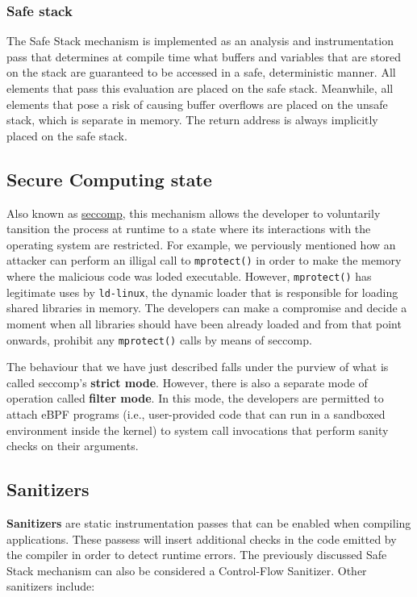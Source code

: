\subsubsection{Safe stack}

The Safe Stack \cite{kuznetzov2018code} mechanism is implemented as an analysis
and instrumentation pass that determines at compile time what buffers and
variables that are stored on the stack are guaranteed to be accessed in a safe,
deterministic manner. All elements that pass this evaluation are placed on the
safe stack. Meanwhile, all elements that pose a risk of causing buffer overflows
are placed on the unsafe stack, which is separate in memory. The return address
is always implicitly placed on the safe stack.

\subsection{Secure Computing state}

Also known as \href{https://www.man7.org/linux/man-pages/man2/seccomp.2.html}{seccomp},
this mechanism allows the developer to voluntarily tansition the process at
runtime to a state where its interactions with the operating system are
restricted. For example, we perviously mentioned how an attacker can perform
an illigal call to \texttt{mprotect()} in order to make the memory where the
malicious code was loded executable. However, \texttt{mprotect()} has legitimate
uses by \texttt{ld-linux}, the dynamic loader that is responsible for loading
shared libraries in memory. The developers can make a compromise and decide a
moment when all libraries should have been already loaded and from that point
onwards, prohibit any \texttt{mprotect()} calls by means of seccomp.

The behaviour that we have just described falls under the purview of what is
called seccomp's \textbf{strict mode}. However, there is also a separate mode
of operation called \textbf{filter mode}. In this mode, the developers are
permitted to attach eBPF programs (i.e., user-provided code that can run in a
sandboxed environment inside the kernel) to system call invocations that perform
sanity checks on their arguments.

\subsection{Sanitizers}

\textbf{Sanitizers} are static instrumentation passes that can be enabled when
compiling applications. These passess will insert additional checks in the
code emitted by the compiler in order to detect runtime errors. The previously
discussed Safe Stack mechanism can also be considered a Control-Flow Sanitizer.
Other sanitizers include:

